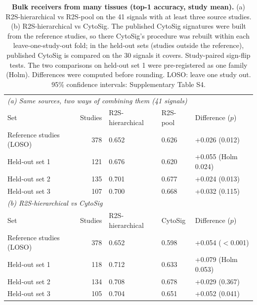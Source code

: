 \begin{table}[!ht]
\centering
\caption{\textbf{Bulk receivers from many tissues (top-1 accuracy, study mean).} (a) R2S-hierarchical vs R2S-pool on the 41 signals with at least three source studies. (b) R2S-hierarchical vs CytoSig. The published CytoSig signatures were built from the reference studies, so there CytoSig's procedure was rebuilt within each leave-one-study-out fold; in the held-out sets (studies outside the reference), published CytoSig is compared on the 30 signals it covers. Study-paired sign-flip tests. The two comparisons on held-out set 1 were pre-registered as one family (Holm). Differences were computed before rounding. LOSO: leave one study out. 95\% confidence intervals: Supplementary Table S4.}
\label{tab:bulk}
\footnotesize
\setlength{\tabcolsep}{4pt}
\begin{tabular}{lrlll}
\toprule
\multicolumn{5}{l}{\emph{(a) Same sources, two ways of combining them (41 signals)}} \\
Set & Studies & R2S-hierarchical & R2S-pool & Difference ($p$) \\
\midrule
Reference studies (LOSO) & 378 & 0.652 & 0.626 & +0.026 (0.012) \\
Held-out set 1 & 121 & 0.676 & 0.620 & +0.055 (Holm 0.024) \\
Held-out set 2 & 135 & 0.701 & 0.677 & +0.024 (0.013) \\
Held-out set 3 & 107 & 0.700 & 0.668 & +0.032 (0.115) \\
\midrule
\multicolumn{5}{l}{\emph{(b) R2S-hierarchical vs CytoSig}} \\
Set & Studies & R2S-hierarchical & CytoSig & Difference ($p$) \\
\midrule
Reference studies (LOSO) & 378 & 0.652 & 0.598 & +0.054 ($<$0.001) \\
Held-out set 1 & 118 & 0.712 & 0.633 & +0.079 (Holm 0.053) \\
Held-out set 2 & 134 & 0.708 & 0.678 & +0.029 (0.367) \\
Held-out set 3 & 105 & 0.704 & 0.651 & +0.052 (0.041) \\
\bottomrule
\end{tabular}
\end{table}
